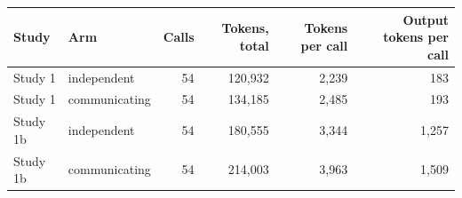 \begin{tabular}{llrrrr}
\toprule
Study & Arm & Calls & Tokens, total & Tokens per call & Output tokens per call \\
\midrule
Study 1 & independent & 54 & 120,932 & 2,239 & 183 \\
Study 1 & communicating & 54 & 134,185 & 2,485 & 193 \\
Study 1b & independent & 54 & 180,555 & 3,344 & 1,257 \\
Study 1b & communicating & 54 & 214,003 & 3,963 & 1,509 \\
\bottomrule
\end{tabular}
